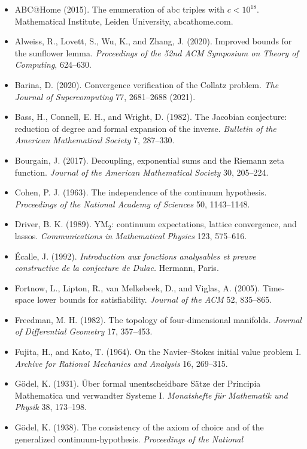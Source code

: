 \documentclass[10pt,twocolumn]{article}
\providecommand{\tightlist}{\setlength{\itemsep}{0pt}\setlength{\parskip}{0pt}}
\begin{document}
\begin{itemize}
\tightlist
\item
  ABC@Home (2015). The enumeration of abc triples with \(c < 10^{18}\).
  Mathematical Institute, Leiden University, abcathome.com.
\item
  Alweiss, R., Lovett, S., Wu, K., and Zhang, J. (2020). Improved bounds
  for the sunflower lemma. \emph{Proceedings of the 52nd ACM Symposium
  on Theory of Computing}, 624--630.
\item
  Barina, D. (2020). Convergence verification of the Collatz problem.
  \emph{The Journal of Supercomputing} 77, 2681--2688 (2021).
\item
  Bass, H., Connell, E. H., and Wright, D. (1982). The Jacobian
  conjecture: reduction of degree and formal expansion of the inverse.
  \emph{Bulletin of the American Mathematical Society} 7, 287--330.
\item
  Bourgain, J. (2017). Decoupling, exponential sums and the Riemann zeta
  function. \emph{Journal of the American Mathematical Society} 30,
  205--224.
\item
  Cohen, P. J. (1963). The independence of the continuum hypothesis.
  \emph{Proceedings of the National Academy of Sciences} 50, 1143--1148.
\item
  Driver, B. K. (1989). YM\(_2\): continuum expectations, lattice
  convergence, and lassos. \emph{Communications in Mathematical Physics}
  123, 575--616.
\item
  Écalle, J. (1992). \emph{Introduction aux fonctions analysables et
  preuve constructive de la conjecture de Dulac.} Hermann, Paris.
\item
  Fortnow, L., Lipton, R., van Melkebeek, D., and Viglas, A. (2005).
  Time-space lower bounds for satisfiability. \emph{Journal of the ACM}
  52, 835--865.
\item
  Freedman, M. H. (1982). The topology of four-dimensional manifolds.
  \emph{Journal of Differential Geometry} 17, 357--453.
\item
  Fujita, H., and Kato, T. (1964). On the Navier--Stokes initial value
  problem I. \emph{Archive for Rational Mechanics and Analysis} 16,
  269--315.
\item
  Gödel, K. (1931). Über formal unentscheidbare Sätze der Principia
  Mathematica und verwandter Systeme I. \emph{Monatshefte für Mathematik
  und Physik} 38, 173--198.
\item
  Gödel, K. (1938). The consistency of the axiom of choice and of the
  generalized continuum-hypothesis. \emph{Proceedings of the National
}
\end{itemize}
\end{document}
